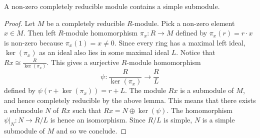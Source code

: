 \documentclass[a4paper]{article}
\begin{document}
\begin{lmm}{}{} A non-zero completely reducible module contains a simple submodule. \tcbline
\begin{proof}
Let $M$ be a completely reducible $R$-module. Pick a non-zero element $x\in M$. Then left $R$-module homomorphism $\pi_x:R\to M$ defined by $\pi_x(r)=r\cdot x$ is non-zero because $\pi_x(1)=x\neq 0$. Since every ring has a maximal left ideal, $\ker(\pi_x)$ as an ideal also lies in some maximal ideal $L$. Notice that $Rx\cong\frac{R}{\ker(\pi_x)}$. This gives a surjective $R$-module homomorphism $$\psi:\frac{R}{\ker(\pi_x)}\to\frac{R}{L}$$ defined by $\psi(r+\ker(\pi_x))=r+L$. The module $Rx$ is a submodule of $M$, and hence completely reducible by the above lemma. This means that there exists a submodule $N$ of $Rx$ such that $Rx=N\oplus\ker(\psi)$. The homomorphism $\psi|_N:N\to R/L$ is hence an isomorphism. Since $R/L$ is simple, $N$ is a simple submodule of $M$ and so we conclude. 
\end{proof}
\end{lmm}
\end{document}
